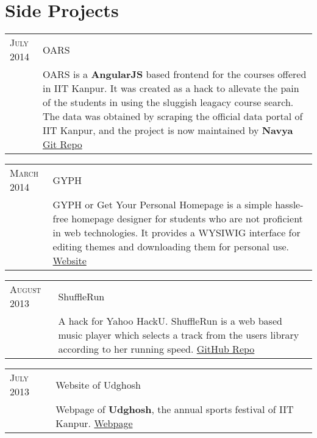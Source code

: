 \documentclass[a4paper,10pt]{article} %
\begin{document}
\section{Side Projects}

\begin{tabular}{p{2.2cm}|p{11cm}}
    \textsc{July 2014} & OARS\\
                       & \footnotesize{OARS is a \textbf{AngularJS} based frontend for the
                          courses offered in IIT Kanpur. It was created as a
                          hack to allevate the pain of the students in using the
                          sluggish leagacy course search. The data was obtained by
                          scraping the official data portal of IIT Kanpur, and the
                          project is now maintained by \textbf{Navya}
                          \href{https://github.com/navya/oars} {Git Repo} }\\

\end{tabular}

\begin{tabular}{p{2.2cm}|p{11cm}}
    \textsc{March 2014} & GYPH\\
                        & \footnotesize{GYPH or Get Your Personal Homepage
                           is a simple hassle-free homepage designer for students who are not
                           proficient in web technologies. It provides a WYSIWIG
                           interface for editing themes and downloading them for personal use.
                           \href{http://gyph2.herokuapp.com/} {Website} } \\
\end{tabular}

\begin{tabular}{p{2.2cm}|p{11cm}}
    \textsc{August 2013} & ShuffleRun\\
                         & \footnotesize{A hack for Yahoo HackU. ShuffleRun is a
                            web based music player which selects a track from the users library
                            according to her running speed.
                            \href{https://github.com/srijanshetty/ShuffleRun} {GitHub Repo} }\\
\end{tabular}

\begin{tabular}{p{2.2cm}|p{11cm}}
    \textsc{July 2013} & Website of Udghosh\\
                       & \footnotesize{Webpage of \textbf{Udghosh}, the annual sports festival of
                          IIT Kanpur. \href{www.udghosh.org} {Webpage} } \\
\end{tabular}
\end{document}
